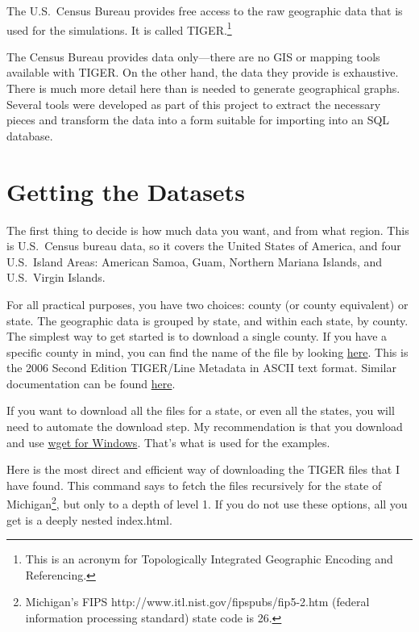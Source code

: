 \documentclass[11pt,letterpaper,onecolumn,twoside,openright,final]{report}
\begin{document}
The U.S.~Census Bureau provides free access to the raw geographic data that is used for the simulations.
It is called TIGER.\footnote{This is an acronym for Topologically Integrated Geographic Encoding and Referencing.}

The Census Bureau provides data only---there are no GIS or mapping tools available with TIGER.
On the other hand, the data they provide is exhaustive.
There is much more detail here than is needed to generate geographical graphs.
Several tools were developed as part of this project to extract the necessary pieces and transform the data into a form suitable for importing into an SQL database.

\section{Getting the Datasets}
The first thing to decide is how much data you want, and from what region.
This is U.S.~Census bureau data, so it covers the United States of America, and four U.S.~Island Areas: American Samoa, Guam, Northern Mariana Islands, and U.S.~Virgin Islands.

For all practical purposes, you have two choices: county (or county equivalent) or state.
The geographic data is grouped by state, and within each state, by county.
The simplest way to get started is to download a single county.
If you have a specific county in mind, you can find the name of the file by looking \href{http://www.census.gov/geo/tigerline/app\_a03.txt}{here}.
This is the 2006 Second Edition TIGER/Line Metadata in ASCII text format.
Similar documentation can be found \href{http://www.census.gov/geo/www/tiger/tiger2006se/a6seapa.txt}{here}.

If you want to download all the files for a state, or even all the states, you will need to automate the download step.
My recommendation is that you download and use \href{http://users.ugent.be/~bpuype/wget/}{wget for Windows}.
That's what is used for the examples.

Here is the most direct and efficient way of downloading the TIGER files that I have found.
This command says to fetch the files recursively for the state of Michigan\footnote{Michigan's FIPS http://www.itl.nist.gov/fipspubs/fip5-2.htm (federal information processing standard) state code is 26.}, but only to a depth of level 1.
If you do not use these options, all you get is a deeply nested index.html.
\end{document}

